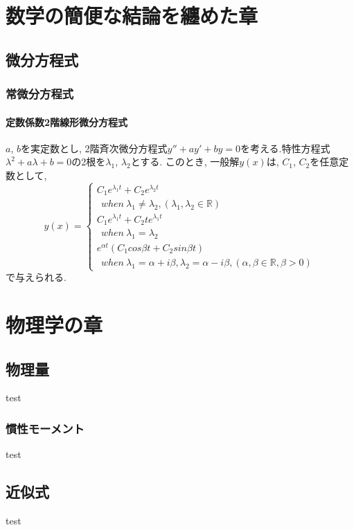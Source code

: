 \documentclass[]{jreport}
\begin{document}
\part{数学の簡便な結論を纏めた章}
\chapter{微分方程式}
\section{常微分方程式}
\subsection{定数係数2階線形微分方程式}

$a$, $b$を実定数とし, 2階斉次微分方程式$y''+ay'+by=0$を考える.特性方程式$\lambda^2+a\lambda+b=0$の2根を$\lambda_{1}$, $\lambda_{2}$とする. このとき, 一般解$y(x)$は, $C_{1}$, $C_{2}$を任意定数として, \\
\begin{equation}
    y(x)= \left \{
        \begin{array}{l}
            C_{1}e^{\lambda_{1} t}+C_{2}e^{\lambda_{2} t}\\
            \ \ when \ \lambda_{1}\neq\lambda_{2}, (\lambda_{1}, \lambda_{2}\in\mathbb{R}) \\
            C_{1}e^{\lambda_{1} t}+C_{2}te^{\lambda_{1} t}\\
            \ \ when \ \lambda_{1}=\lambda_{2} \\
            e^{\alpha t}(C_{1}cos{\beta t}+C_{2}sin{\beta t}) \\
            \ \ when \ \lambda_{1}=\alpha+{i\beta}, \lambda_{2}=\alpha-{i\beta}, (\alpha, \beta\in\mathbb{R}, \beta>0)
        \end{array}
    \right.
\end{equation}
で与えられる.

\part{物理学の章}
\chapter{物理量}

test

\section{慣性モーメント}

test

\chapter{近似式}

test
\end{document}
